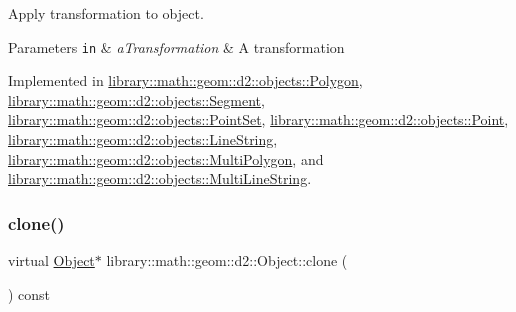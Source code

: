 Apply transformation to object. 


\begin{DoxyParams}[1]{Parameters}
\mbox{\tt in}  & {\em a\+Transformation} & A transformation \\
\hline
\end{DoxyParams}


Implemented in \hyperlink{classlibrary_1_1math_1_1geom_1_1d2_1_1objects_1_1_polygon_a920b30eb110c7164f65754979da17638}{library\+::math\+::geom\+::d2\+::objects\+::\+Polygon}, \hyperlink{classlibrary_1_1math_1_1geom_1_1d2_1_1objects_1_1_segment_a5cb71beeb4de3c2c1b84fbfb8546c935}{library\+::math\+::geom\+::d2\+::objects\+::\+Segment}, \hyperlink{classlibrary_1_1math_1_1geom_1_1d2_1_1objects_1_1_point_set_acfb8652fd1f17f101e7750a0b81452c0}{library\+::math\+::geom\+::d2\+::objects\+::\+Point\+Set}, \hyperlink{classlibrary_1_1math_1_1geom_1_1d2_1_1objects_1_1_point_a71d3ef79dbffcd2568d1a2c6bad807d7}{library\+::math\+::geom\+::d2\+::objects\+::\+Point}, \hyperlink{classlibrary_1_1math_1_1geom_1_1d2_1_1objects_1_1_line_string_abd9e77eb0e1d319e8f9af23ccb6dc0b4}{library\+::math\+::geom\+::d2\+::objects\+::\+Line\+String}, \hyperlink{classlibrary_1_1math_1_1geom_1_1d2_1_1objects_1_1_multi_polygon_af4adcde904edd77d54236517652e4da1}{library\+::math\+::geom\+::d2\+::objects\+::\+Multi\+Polygon}, and \hyperlink{classlibrary_1_1math_1_1geom_1_1d2_1_1objects_1_1_multi_line_string_a6180a8b94ff175d6313a74ad4e680bc7}{library\+::math\+::geom\+::d2\+::objects\+::\+Multi\+Line\+String}.

\mbox{\label{classlibrary_1_1math_1_1geom_1_1d2_1_1_object_a5c26ae4120edb24f6463d65a9cef247d}} 
\subsubsection{\texorpdfstring{clone()}{clone()}}
{\footnotesize\ttfamily virtual \hyperlink{classlibrary_1_1math_1_1geom_1_1d2_1_1_object}{Object}$\ast$ library\+::math\+::geom\+::d2\+::\+Object\+::clone (\begin{DoxyParamCaption}{ }\end{DoxyParamCaption}) const\hspace{0.3cm}{\ttfamily [pure virtual]}}



